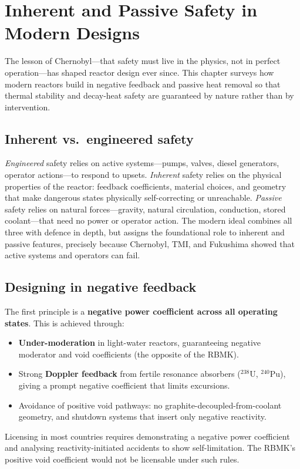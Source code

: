\chapter{Inherent and Passive Safety in Modern Designs}
\label{ch:inherent}

The lesson of Chernobyl---that safety must live in the physics, not in perfect
operation---has shaped reactor design ever since. This chapter surveys how modern
reactors build in negative feedback and passive heat removal so that thermal
stability and decay-heat safety are guaranteed by nature rather than by
intervention.

\section{Inherent vs.\ engineered safety}

\emph{Engineered} safety relies on active systems---pumps, valves, diesel
generators, operator actions---to respond to upsets. \emph{Inherent} safety relies
on the physical properties of the reactor: feedback coefficients, material
choices, and geometry that make dangerous states physically self-correcting or
unreachable. \emph{Passive} safety relies on natural forces---gravity, natural
circulation, conduction, stored coolant---that need no power or operator action.
The modern ideal combines all three with defence in depth, but assigns the
foundational role to inherent and passive features, precisely because Chernobyl,
TMI, and Fukushima showed that active systems and operators can fail.

\section{Designing in negative feedback}

The first principle is a \textbf{negative power coefficient across all operating
states}. This is achieved through:
\begin{itemize}[nosep]
\item \textbf{Under-moderation} in light-water reactors, guaranteeing negative
moderator and void coefficients (the opposite of the RBMK).
\item Strong \textbf{Doppler feedback} from fertile resonance absorbers
($^{238}$U, $^{240}$Pu), giving a prompt negative coefficient that limits
excursions.
\item Avoidance of positive void pathways: no graphite-decoupled-from-coolant
geometry, and shutdown systems that insert only negative reactivity.
\end{itemize}
Licensing in most countries requires demonstrating a negative power coefficient and
analysing reactivity-initiated accidents to show self-limitation. The RBMK's
positive void coefficient would not be licensable under such rules.

